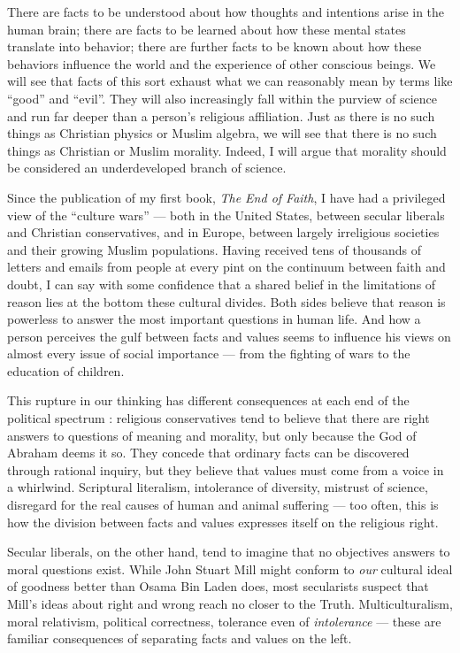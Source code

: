 \documentclass[a4paper,14pt]{extbook}
\begin{document}
There are facts to be understood about how thoughts and intentions arise in the human brain;
there are facts to be learned about how these mental states translate into behavior;
there are further facts to be known about how these behaviors influence the world and the experience of other conscious beings.
We will see that facts of this sort exhaust what we can reasonably mean by terms like ``good'' and ``evil''.
They will also increasingly fall within the purview of science and run far deeper than a person's religious affiliation.
Just as there is no such things as Christian physics or Muslim algebra, we will see that there is no such things as Christian or Muslim morality.
Indeed, I will argue that morality should be considered an underdeveloped branch of science.

Since the publication of my first book, \textit{The End of Faith}, I have had a privileged view of the ``culture wars'' --- both in the United States, between secular liberals and Christian conservatives, and in Europe, between largely irreligious societies and their growing Muslim populations.
Having received tens of thousands of letters and emails from people at every pint on the continuum between faith and doubt, I can say with some confidence that a shared belief in the limitations of reason lies at the bottom these cultural divides.
Both sides believe that reason is powerless to answer the most important questions in human life.
And how a person perceives the gulf between facts and values seems to influence his views on almost every issue of social importance --- from the fighting of wars to the education of children.

This rupture in our thinking has different consequences at each end of the political spectrum :
religious conservatives tend to believe that there are right answers to questions of meaning and morality, but only because the God of Abraham deems it so.
They concede that ordinary facts can be discovered through rational inquiry, but they believe that values must come from a voice in a whirlwind.
Scriptural literalism, intolerance of diversity, mistrust of science, disregard for the real causes of human and animal suffering --- too often, this is how the division between facts and values expresses itself on the religious right.

Secular liberals, on the other hand, tend to imagine that no objectives answers to moral questions exist.
While John Stuart Mill might conform to \textit{our} cultural ideal of goodness better than Osama Bin Laden does, most secularists suspect that Mill's ideas about right and wrong reach no closer to the Truth.
Multiculturalism, moral relativism, political correctness, tolerance even of \textit{intolerance} --- these are familiar consequences of separating facts and values on the left.
\end{document}
